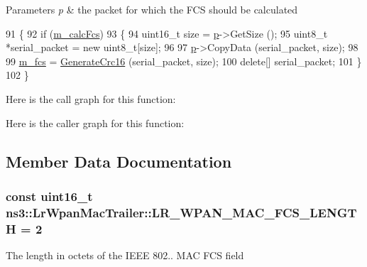 \begin{DoxyParams}{Parameters}
{\em p} & the packet for which the F\+CS should be calculated \\
\hline
\end{DoxyParams}

\begin{DoxyCode}
91 \{
92   \textcolor{keywordflow}{if} (\hyperlink{classns3_1_1LrWpanMacTrailer_a13461a0773b090951d9807e5849463c7}{m\_calcFcs})
93     \{
94       uint16\_t size = \hyperlink{lte__link__budget_8m_ac9de518908a968428863f829398a4e62}{p}->GetSize ();
95       uint8\_t *serial\_packet = \textcolor{keyword}{new} uint8\_t[size];
96 
97       \hyperlink{lte__link__budget_8m_ac9de518908a968428863f829398a4e62}{p}->CopyData (serial\_packet, size);
98 
99       \hyperlink{classns3_1_1LrWpanMacTrailer_a86cd487d10f4d7072a1a50d53640eb64}{m\_fcs} = \hyperlink{classns3_1_1LrWpanMacTrailer_a834005b6ad953ca027a5782a93613718}{GenerateCrc16} (serial\_packet, size);
100       \textcolor{keyword}{delete}[] serial\_packet;
101     \}
102 \}
\end{DoxyCode}


Here is the call graph for this function\+:




Here is the caller graph for this function\+:




\subsection{Member Data Documentation}
\subsubsection[{\texorpdfstring{L\+R\+\_\+\+W\+P\+A\+N\+\_\+\+M\+A\+C\+\_\+\+F\+C\+S\+\_\+\+L\+E\+N\+G\+TH}{LR_WPAN_MAC_FCS_LENGTH}}]{\setlength{\rightskip}{0pt plus 5cm}const uint16\+\_\+t ns3\+::\+Lr\+Wpan\+Mac\+Trailer\+::\+L\+R\+\_\+\+W\+P\+A\+N\+\_\+\+M\+A\+C\+\_\+\+F\+C\+S\+\_\+\+L\+E\+N\+G\+TH = 2\hspace{0.3cm}{\ttfamily [static]}}\hypertarget{classns3_1_1LrWpanMacTrailer_a7fb9fd20bbe032e1be52e07a23348feb}{}\label{classns3_1_1LrWpanMacTrailer_a7fb9fd20bbe032e1be52e07a23348feb}
The length in octets of the I\+E\+EE 802.. M\+AC F\+CS field 
